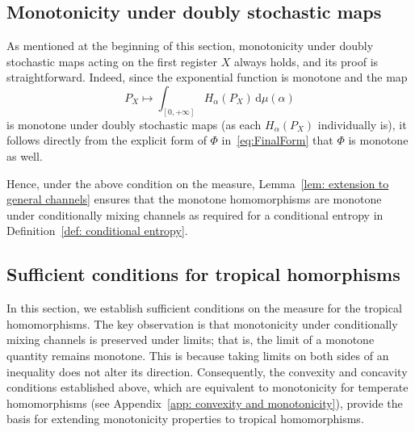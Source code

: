 \documentclass[aps,pra,11pt,onecolumn,nofootinbib,tightenlines]{revtex4-2}
\theoremstyle{definition}
\def \d {\mathrm{d}}
\begin{document}
\subsection{Monotonicity under doubly stochastic maps}
\label{sec: monotonicty doubly stochastic}
As mentioned at the beginning of this section, monotonicity under doubly stochastic maps acting on the first register \(X\) always holds, and its proof is straightforward.
Indeed, since the exponential function is monotone and the map
\begin{equation}
    P_X \mapsto \int_{[0,+\infty]} H_\alpha(P_X) \,\d\mu(\alpha)
\end{equation}
is monotone under doubly stochastic maps (as each $H_\alpha(P_X)$ individually is), it follows directly from the explicit form of $\Phi$ in~\eqref{eq:FinalForm} that $\Phi$ is monotone as well. 

Hence, under the above condition on the measure, Lemma~\ref{lem: extension to general channels} ensures that the monotone homomorphisms are monotone under conditionally mixing channels as required for a conditional entropy in Definition~\ref{def: conditional entropy}. 



\subsection{Sufficient conditions for tropical homorphisms}
In this section, we establish sufficient conditions on the measure for the tropical homomorphisms. The key observation is that monotonicity under conditionally mixing channels is preserved under limits; that is, the limit of a monotone quantity remains monotone. This is because taking limits on both sides of an inequality does not alter its direction. Consequently, the convexity and concavity conditions established above, which are equivalent to monotonicity for temperate homomorphisms (see Appendix~\ref{app: convexity and monotonicity}), provide the basis for extending monotonicity properties to tropical homomorphisms.
\end{document}
